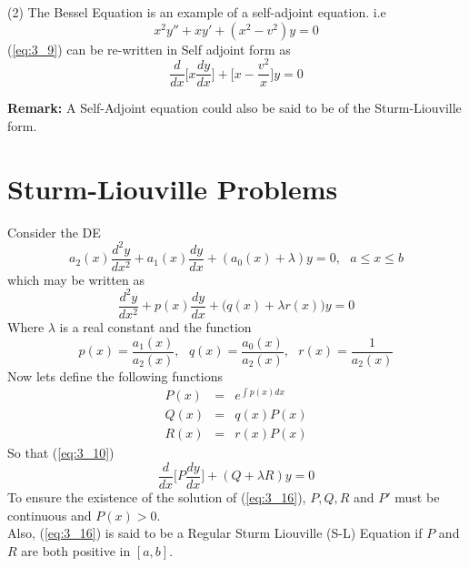\documentclass[12pt]{report}
\newcommand{\bt}[1]{\textbf{#1}}
\newcommand{\sps}{\\[0.2cm]}
\newcommand{\refn}[1]{(\ref{#1})}
\newcommand{\refx}[1]{\refn{eq:#1}}
\newcommand{\NI}{\noindent}
\newcommand{\sprime}{'}
\newcommand{\dprime}{''}
\begin{document}
	\NI (2) The Bessel Equation is an example of a self-adjoint equation. i.e 
	\begin{equation}
		x^2y\dprime + xy\sprime + (x^2-v^2)y = 0  \label{eq:3_9}
	\end{equation}
	\refx{3_9} can be re-written in Self adjoint form as
	\begin{equation*}
		\frac{d}{dx}\Big[x\frac{dy}{dx}\Big] + \Big[x - \frac{v^2}{x}\Big]y = 0 
	\end{equation*}

	\NI\bt{Remark:} A Self-Adjoint equation could also be said to be of the Sturm-Liouville form.\sps


	\section{Sturm-Liouville Problems}
	Consider the DE
	\begin{equation}
		a_2(x)\frac{d^2y}{dx^2} + a_1(x)\frac{dy}{dx} + (a_0(x) + \lambda)y = 0, ~~~a \leq x \leq b \label{eq:3_10}
	\end{equation}
	which may be written as
	\begin{equation}
		\frac{d^2y}{dx^2} + p(x)\frac{dy}{dx} + \Big(q(x) + \lambda r(x)\Big)y = 0 \label{eq:3_11}
	\end{equation}
	Where $\lambda$ is a real constant and the function
	\begin{equation}
		p(x) = \frac{a_1(x)}{a_2(x)}, ~~~ q(x) = \frac{a_0(x)}{a_2(x)}, ~~~ r(x) = \frac{1}{a_2(x)} \label{eq:3_12}
	\end{equation}
	Now lets define the following functions
	\begin{eqnarray}
		P(x) &=& e^{\int p(x)dx} \label{eq:3_13}\sps
		Q(x) &=& q(x)P(x) \label{eq:3_14} \sps
		R(x) &=& r(x)P(x) \label{eq:3_15}
	\end{eqnarray}
	So that \refx{3_10}
	\begin{equation}
		\frac{d}{dx}\Big[P\frac{dy}{dx}\Big] + (Q + \lambda R)y = 0 \label{eq:3_16}
	\end{equation}
	To ensure the existence of the solution of \refx{3_16}, $P, Q, R$ and $P\sprime$ must be continuous and $P(x) > 0$.\sps
	Also, \refx{3_16} is said to be a Regular Sturm Liouville (S-L) Equation if $P$ and $R$ are both positive in $[a,b]$.
	
	
\end{document}
